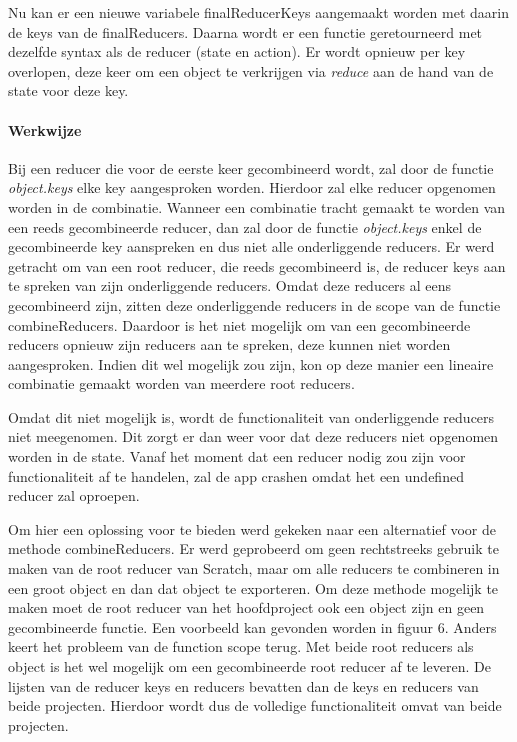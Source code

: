 Nu kan er een nieuwe variabele finalReducerKeys aangemaakt worden met daarin de keys van de finalReducers. Daarna wordt er een functie geretourneerd met dezelfde syntax als de reducer (state en action). Er wordt opnieuw per key overlopen, deze keer om een object te verkrijgen via \textit{reduce} aan de hand van de state voor deze key.

\paragraph{Werkwijze}

Bij een reducer die voor de eerste keer gecombineerd wordt, zal door de functie \textit{object.keys} elke key aangesproken worden. Hierdoor zal elke reducer opgenomen worden in de combinatie. Wanneer een combinatie tracht gemaakt te worden van een reeds gecombineerde reducer, dan zal door de functie \textit{object.keys} enkel de gecombineerde key aanspreken en dus niet alle onderliggende reducers. Er werd getracht om van een root reducer, die reeds gecombineerd is, de reducer keys aan te spreken van zijn onderliggende reducers. Omdat deze reducers al eens gecombineerd zijn, zitten deze onderliggende reducers in de scope van de functie combineReducers. Daardoor is het niet mogelijk om van een gecombineerde reducers opnieuw zijn reducers aan te spreken, deze kunnen niet worden aangesproken. Indien dit wel mogelijk zou zijn, kon op deze manier een lineaire combinatie gemaakt worden van meerdere root reducers. 

Omdat dit niet mogelijk is, wordt de functionaliteit van onderliggende reducers niet meegenomen. Dit zorgt er dan weer voor dat deze reducers niet opgenomen worden in de state. Vanaf het moment dat een reducer nodig zou zijn voor functionaliteit af te handelen, zal de app crashen omdat het een undefined reducer zal oproepen. 

Om hier een oplossing voor te bieden werd gekeken naar een alternatief voor de methode combineReducers. 
Er werd geprobeerd om geen rechtstreeks gebruik te maken van de root reducer van Scratch, maar om alle reducers te combineren in een groot object en dan dat object te exporteren. Om deze methode mogelijk te maken moet de root reducer van het hoofdproject ook een object zijn en geen gecombineerde functie. Een voorbeeld kan gevonden worden in figuur 6. Anders keert het probleem van de function scope terug. Met beide root reducers als object is het wel mogelijk om een gecombineerde root reducer af te leveren. De lijsten van de reducer keys en reducers bevatten dan de keys en reducers van beide projecten. Hierdoor wordt dus de volledige functionaliteit omvat van beide projecten.
 
